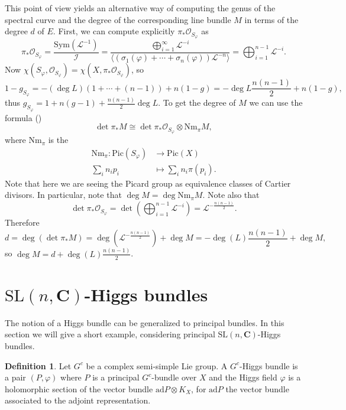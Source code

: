\documentclass[12pt,a4paper]{book}
\theoremstyle{definition} \newtheorem{defn}[thm]{Definition}
\theoremstyle{definition} \newtheorem{ejemplo}[thm]{Example}
\theoremstyle{remark} \newtheorem{rem}[thm]{Remark}
\def\OO{\mathscr{O}}
\def\LL{\mathscr{L}}
\def\II{\mathscr{I}}
\def\CC{\mathbf{C}}
\def\ad{\mathrm{ad}}
\def\Nm{\mathrm{Nm}}
\def\SL{\mathrm{SL}}
\def\Sym{\mathrm{Sym}}
\def\Pic{\mathrm{Pic}}
\let\emph\relax
\begin{document}
  This point of view yields an alternative way of computing the genus of the spectral curve and the degree of the corresponding line bundle $M$ in terms of the degree $d$ of $E$. First, we can compute explicitly $\pi_*\OO_{S_\varphi}$ as
  \begin{equation*}
    \pi_*\OO_{S_\varphi}=\frac{\Sym(\LL^{-1})}{\II}=\frac{\bigoplus_{i=1}^\infty \LL^{-i}}{\langle(\sigma_1(\varphi)+\cdots+\sigma_n(\varphi))\LL^{-n}\rangle}=\bigoplus_{i=1}^{n-1} \LL^{-i}.
  \end{equation*}
  Now $\chi(S_\varphi,\OO_{S_\varphi})=\chi(X,\pi_*\OO_{S_\varphi})$, so 
  \begin{equation*}
    1-g_{S_{\varphi}}=-(\deg L)(1+\cdots+(n-1))+n(1-g)=-\deg L\frac{n(n-1)}{2}+n(1-g),
  \end{equation*}
  thus $g_{S_{\varphi}}=1+n(g-1)+\frac{n(n-1)}{2}\deg L$. To get the degree of $M$ we can use the formula (\cite[Ex. IV.2.6(a)]{hartshorne})
  \begin{equation*}
    \det \pi_*M \cong \det \pi_*\OO_{S_\varphi} \otimes \Nm_\pi M,
  \end{equation*}
  where $\Nm_\pi$ is the \emph{norm map}
  \begin{align*}
    \Nm_\pi :\Pic(S_{\varphi})&\longrightarrow \Pic(X)\\ 
    \sum_{i} n_ip_i &\longmapsto \sum_i n_i \pi(p_i). 
    \end{align*}
    Note that here we are seeing the Picard group as equivalence classes of Cartier divisors. In particular, note that $\deg M = \deg \Nm_\pi M$. Note also that
    \begin{equation*}
      \det \pi_* \OO_{S_\varphi} = \det\left( \bigoplus_{i=1}^{n-1} \LL^{-i}\right) = \LL^{-\frac{n(n-1)}{2}}.
    \end{equation*}
    Therefore
    \begin{equation*}
      d=\deg(\det \pi_*M)=\deg\left( \LL^{-\frac{n(n-1)}{2}} \right)+ \deg M= -\deg(L)\frac{n(n-1)}{2} + \deg M ,
    \end{equation*}
    so $\deg M = d+\deg(L)\frac{n(n-1)}{2}$.
	  
\section{$\SL(n,\CC)$-Higgs bundles}
The notion of a Higgs bundle can be generalized to principal bundles. In this section we will give a short example, considering principal $\SL(n,\CC)$-Higgs bundles.

\begin{defn}
  Let $G^c$ be a complex semi-simple Lie group. A $G^c$-Higgs bundle is a pair $(P,\varphi)$ where $P$ is a principal $G^c$-bundle over $X$ and the Higgs field $\varphi$ is a holomorphic section of the vector bundle $\ad P \otimes K_X$, for $\ad P$ the vector bundle associated to the adjoint representation.
\end{defn}
\end{document}
